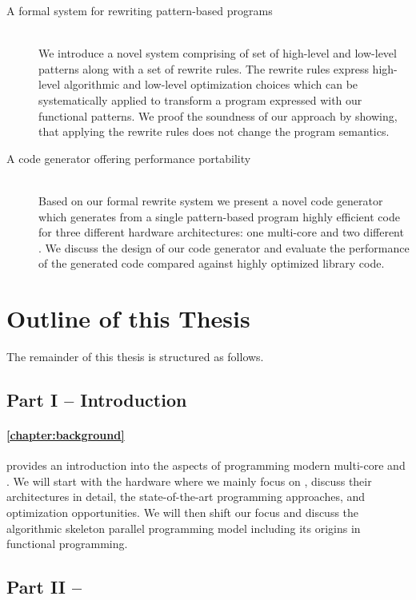 \begin{description}
  \item[A formal system for rewriting pattern-based programs]\hfill\\[-1em]
    We introduce a novel system comprising of set of high-level and low-level patterns along with a set of rewrite rules.
    The rewrite rules express high-level algorithmic and low-level optimization choices which can be systematically applied to transform a program expressed with our functional patterns.
    We proof the soundness of our approach by showing, that applying the rewrite rules does not change the program semantics.

  \item[A code generator offering performance portability]\hfill\\[.25em]
    Based on our formal rewrite system we present a novel code generator which generates from a single pattern-based program highly efficient \OpenCL code for three different hardware architectures:
    one multi-core \CPU and two different \GPUs.
    We discuss the design of our code generator and evaluate the performance of the generated \OpenCL code compared against highly optimized library code.
\end{description}

\section{Outline of this Thesis}
The remainder of this thesis is structured as follows.

\subsection*{Part I -- Introduction}

\paragraph{\autoref{chapter:background}} provides an introduction into the aspects of programming modern multi-core \CPUs and \GPUs.
We will start with the hardware where we mainly focus on \GPUs, discuss their architectures in detail, the state-of-the-art programming approaches, and optimization opportunities.
We will then shift our focus and discuss the algorithmic skeleton parallel programming model including its origins in functional programming.


\subsection*{Part II -- \SkelCL}

